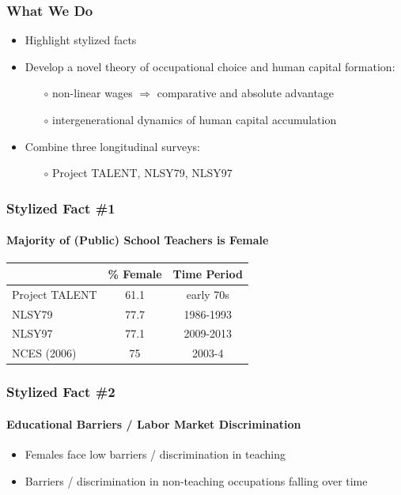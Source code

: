 \documentclass[11pt]{beamer}
\begin{document}
	\begin{frame}
		\frametitle{What We Do}
		\vfill
		\begin{itemize}
			\item Highlight stylized facts
			\vfill
			\item Develop a novel theory of occupational choice and human capital formation: 
			\begin{itemize}
				\item[$\circ$] non-linear wages $\Rightarrow$ comparative and absolute advantage
				\item[$\circ$] intergenerational dynamics of human capital accumulation
			\end{itemize}
			\vfill
			\item Combine three longitudinal surveys: 
			\begin{itemize}
				\item[$\circ$] Project TALENT, NLSY79, NLSY97
			\end{itemize}
		\end{itemize}
		\vfill
	\end{frame}
	
	\begin{frame}
		\frametitle{Stylized Fact \#1}
		\framesubtitle{Majority of (Public) School Teachers is Female}
		\begin{table}[h!]
			\centering 
			\begin{tabular}{l c c }
				\toprule
				& \% Female & Time Period \\
				\midrule
				Project TALENT  &  61.1 & early 70s \\
				NLSY79  & 77.7 & 1986-1993 \\
				NLSY97  & 77.1 & 2009-2013 \\
				\midrule
				NCES (2006) & 75 & 2003-4\\
				\bottomrule
			\end{tabular}
		\end{table}
	\end{frame}
	
	\begin{frame}
		\frametitle{Stylized Fact \#2}
		\framesubtitle{Educational Barriers / Labor Market Discrimination}
		\begin{itemize}
			\item Females face low barriers / discrimination in teaching
			\item Barriers / discrimination in non-teaching occupations falling over time
		\end{itemize}
	\end{frame}
\end{document}
